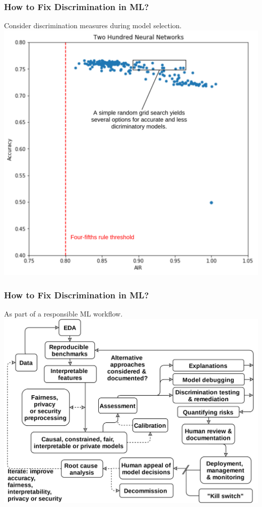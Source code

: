\documentclass[11pt,aspectratio=169,hyperref={colorlinks}]{beamer}
\begin{document}
		\begin{frame}
	
			\frametitle{How to Fix Discrimination in ML?}		
			\centering
			Consider discrimination measures during model selection.\\
			\vspace{10pt}
			{\includegraphics[scale=0.09]{../img/lecture_3.png}}
			
		\end{frame}	
		
		\begin{frame}
		
			\frametitle{How to Fix Discrimination in ML?}		
			\centering
			As part of a responsible ML workflow.\\
			\vspace{10pt}
			{\includegraphics[scale=0.08]{../img/rml_diagram_no_hilite.png}}
			
		\end{frame}		
		
\end{document}
